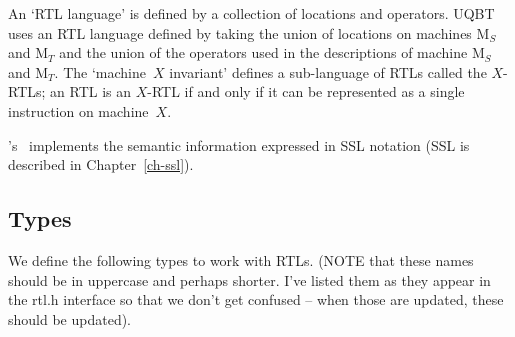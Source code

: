 An `RTL language' is defined by a collection of locations and
operators.
UQBT uses an RTL language defined by taking the union of locations on
machines M$_S$ and M$_T$ and the union of the operators used in the
descriptions of machine M$_S$ and M$_T$.
The `machine~$X$ invariant' defines a sub-language of RTLs called
the $X$-RTLs; an RTL is an $X$-RTL if and only if it can be represented
as a single instruction on machine~$X$.

\uqbt 's \rtl\ implements the semantic information expressed in SSL
notation (SSL is described in Chapter~\ref{ch-ssl}).  

\subsection{Types}
\label{sec-rtltypes}
We define the following types to work with RTLs.  
(NOTE that these names should be in uppercase and perhaps shorter.
I've listed them as they appear in the rtl.h interface so that we don't
get confused -- when those are updated, these should be updated).
